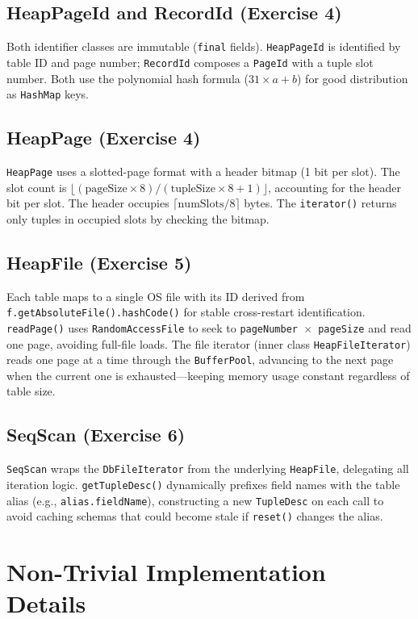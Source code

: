 \documentclass[11pt]{article}
\begin{document}
\subsection{HeapPageId and RecordId (Exercise 4)}
Both identifier classes are immutable (\texttt{final} fields). \texttt{HeapPageId} is identified by table ID and page number; \texttt{RecordId} composes a \texttt{PageId} with a tuple slot number. Both use the polynomial hash formula ($31 \times a + b$) for good distribution as \texttt{HashMap} keys.

\subsection{HeapPage (Exercise 4)}
\texttt{HeapPage} uses a slotted-page format with a header bitmap (1 bit per slot). The slot count is $\lfloor (\text{pageSize} \times 8) / (\text{tupleSize} \times 8 + 1) \rfloor$, accounting for the header bit per slot. The header occupies $\lceil \text{numSlots} / 8 \rceil$ bytes. The \texttt{iterator()} returns only tuples in occupied slots by checking the bitmap.

\subsection{HeapFile (Exercise 5)}
Each table maps to a single OS file with its ID derived from \texttt{f.getAbsoluteFile().hashCode()} for stable cross-restart identification. \texttt{readPage()} uses \texttt{RandomAccessFile} to seek to \texttt{pageNumber $\times$ pageSize} and read one page, avoiding full-file loads. The file iterator (inner class \texttt{HeapFileIterator}) reads one page at a time through the \texttt{BufferPool}, advancing to the next page when the current one is exhausted---keeping memory usage constant regardless of table size.

\subsection{SeqScan (Exercise 6)}
\texttt{SeqScan} wraps the \texttt{DbFileIterator} from the underlying \texttt{HeapFile}, delegating all iteration logic. \texttt{getTupleDesc()} dynamically prefixes field names with the table alias (e.g., \texttt{alias.fieldName}), constructing a new \texttt{TupleDesc} on each call to avoid caching schemas that could become stale if \texttt{reset()} changes the alias.

\section{Non-Trivial Implementation Details}
\end{document}

